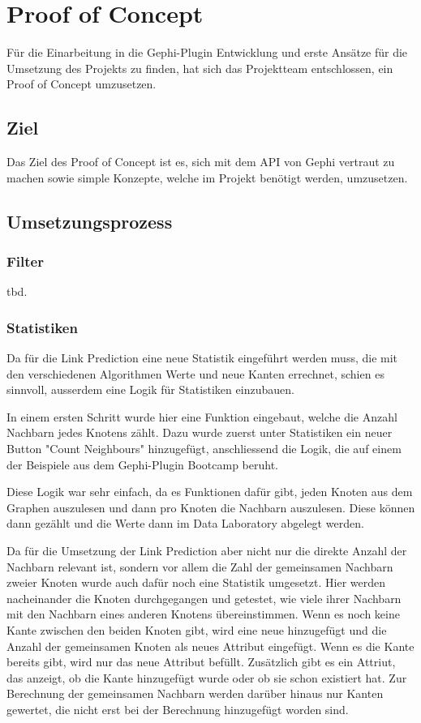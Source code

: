 \chapter{Proof of Concept}

Für die Einarbeitung in die Gephi-Plugin Entwicklung und erste Ansätze für die Umsetzung des Projekts zu finden, hat
sich das Projektteam entschlossen, ein Proof of Concept umzusetzen.

\section{Ziel}

Das Ziel des Proof of Concept ist es, sich mit dem API von Gephi vertraut zu machen sowie simple Konzepte, welche im
Projekt benötigt werden, umzusetzen.

\section{Umsetzungsprozess}

\subsection{Filter}

tbd.

\subsection{Statistiken}

Da für die Link Prediction eine neue Statistik eingeführt werden muss, die mit den verschiedenen Algorithmen Werte und
neue Kanten errechnet, schien es sinnvoll, ausserdem eine Logik für Statistiken einzubauen.

In einem ersten Schritt wurde hier eine Funktion eingebaut, welche die Anzahl Nachbarn jedes Knotens zählt. Dazu wurde
zuerst unter Statistiken ein neuer Button "Count Neighbours" hinzugefügt, anschliessend die Logik, die auf einem der
Beispiele aus dem Gephi-Plugin Bootcamp beruht.

Diese Logik war sehr einfach, da es Funktionen dafür gibt, jeden Knoten aus dem Graphen auszulesen und dann pro Knoten
die Nachbarn auszulesen. Diese können dann gezählt und die Werte dann im Data Laboratory abgelegt werden.

Da für die Umsetzung der Link Prediction aber nicht nur die direkte Anzahl der Nachbarn relevant ist, sondern vor allem
die Zahl der gemeinsamen Nachbarn zweier Knoten wurde auch dafür noch eine Statistik umgesetzt. Hier werden nacheinander
die Knoten durchgegangen und getestet, wie viele ihrer Nachbarn mit den Nachbarn eines anderen Knotens übereinstimmen.
Wenn es noch keine Kante zwischen den beiden Knoten gibt, wird eine neue hinzugefügt und die Anzahl der gemeinsamen
Knoten als neues Attribut eingefügt. Wenn es die Kante bereits gibt, wird nur das neue Attribut befüllt. Zusätzlich
gibt es ein Attriut, das anzeigt, ob die Kante hinzugefügt wurde oder ob sie schon existiert hat. Zur Berechnung der
gemeinsamen Nachbarn werden darüber hinaus nur Kanten gewertet, die nicht erst bei der Berechnung hinzugefügt worden
sind.

